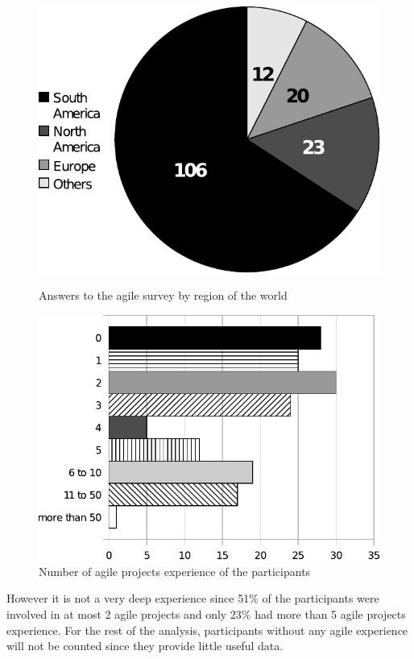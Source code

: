 \documentclass[lnbip]{svmultln}
\begin{document}
\begin{figure}[htb]
  \begin{minipage}[t]{0.5\linewidth}
    \includegraphics[scale=0.5]{agile-world.pdf}
    \caption{Answers to the agile survey by region of the world}
    \label{fig:agile-world}
  \end{minipage}
  \begin{minipage}[t]{0.5\linewidth}
    \includegraphics[scale=0.5]{agile-xp.pdf}
    \caption{Number of agile projects experience of the participants}
    \label{fig:agile-xp}
  \end{minipage}
\end{figure}

However it is not a very deep experience since 51\% of the
participants were involved in at most 2 agile projects and only 23\%
had more than 5 agile projects experience.  For the rest of the
analysis, participants without any agile experience will not be
counted since they provide little useful data.
\end{document}
